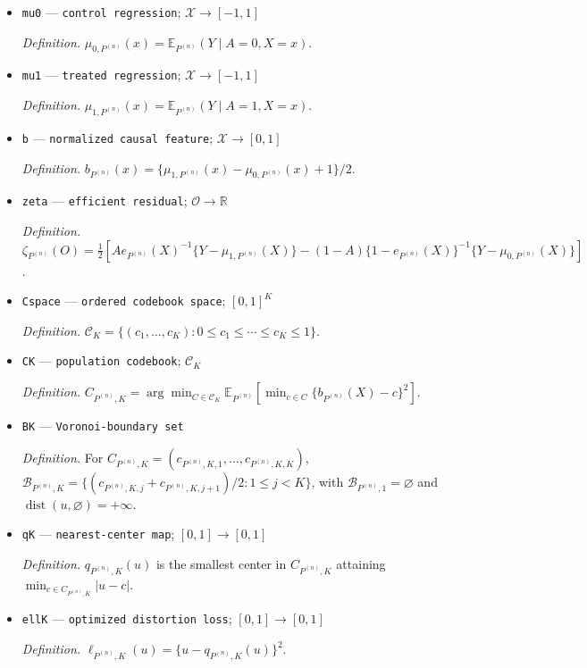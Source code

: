 \documentclass{article}
\begin{document}
\begin{itemize}
  \item \texttt{mu0} --- \texttt{control regression}; \(\mathcal X\to[-1,1]\)
  \par\smallskip\noindent\emph{Definition.} \(\mu_{0,P^{(n)}}(x)=\mathbb E_{P^{(n)}}(Y\mid A=0,X=x)\).
  \item \texttt{mu1} --- \texttt{treated regression}; \(\mathcal X\to[-1,1]\)
  \par\smallskip\noindent\emph{Definition.} \(\mu_{1,P^{(n)}}(x)=\mathbb E_{P^{(n)}}(Y\mid A=1,X=x)\).
  \item \texttt{b} --- \texttt{normalized causal feature}; \(\mathcal X\to[0,1]\)
  \par\smallskip\noindent\emph{Definition.} \(b_{P^{(n)}}(x)=\{\mu_{1,P^{(n)}}(x)-\mu_{0,P^{(n)}}(x)+1\}/2\).
  \item \texttt{zeta} --- \texttt{efficient residual}; \(\mathcal O\to\mathbb R\)
  \par\smallskip\noindent\emph{Definition.} \(\zeta_{P^{(n)}}(O)=\tfrac12[Ae_{P^{(n)}}(X)^{-1}\{Y-\mu_{1,P^{(n)}}(X)\}-(1-A)\{1-e_{P^{(n)}}(X)\}^{-1}\{Y-\mu_{0,P^{(n)}}(X)\}]\).
  \item \texttt{Cspace} --- \texttt{ordered codebook space}; \([0,1]^K\)
  \par\smallskip\noindent\emph{Definition.} \(\mathcal C_K=\{(c_1,\ldots,c_K):0\le c_1\le\cdots\le c_K\le1\}\).
  \item \texttt{CK} --- \texttt{population codebook}; \(\mathcal C_K\)
  \par\smallskip\noindent\emph{Definition.} \(C_{P^{(n)},K}=\arg\min_{C\in\mathcal C_K}\mathbb E_{P^{(n)}}[\min_{c\in C}\{b_{P^{(n)}}(X)-c\}^2]\).
  \item \texttt{BK} --- \texttt{Voronoi-\allowbreak{}boundary set}
  \par\smallskip\noindent\emph{Definition.} For \(C_{P^{(n)},K}=(c_{P^{(n)},K,1},\ldots,c_{P^{(n)},K,K})\), \(\mathcal B_{P^{(n)},K}=\{(c_{P^{(n)},K,j}+c_{P^{(n)},K,j+1})/2:1\le j<K\}\), with \(\mathcal B_{P^{(n)},1}=\varnothing\) and \(\operatorname{dist}(u,\varnothing)=+\infty\).
  \item \texttt{qK} --- \texttt{nearest-\allowbreak{}center map}; \([0,1]\to[0,1]\)
  \par\smallskip\noindent\emph{Definition.} \(q_{P^{(n)},K}(u)\) is the smallest center in \(C_{P^{(n)},K}\) attaining \(\min_{c\in C_{P^{(n)},K}}|u-c|\).
  \item \texttt{ellK} --- \texttt{optimized distortion loss}; \([0,1]\to[0,1]\)
  \par\smallskip\noindent\emph{Definition.} \(\ell_{P^{(n)},K}(u)=\{u-q_{P^{(n)},K}(u)\}^2\).

\end{itemize}
\end{document}
